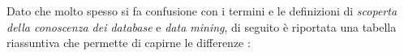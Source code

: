 Dato che molto spesso si fa confusione con i termini e le definizioni di \textit{scoperta della conoscenza dei database} e \textit{data mining}, di seguito è riportata una tabella riassuntiva che permette di capirne le differenze \cite{geeksforgeeks_data_mining}:

